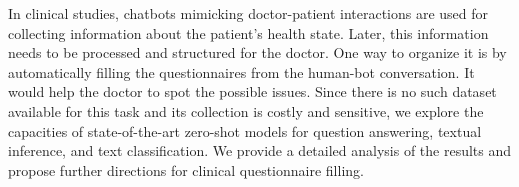 In clinical studies, chatbots mimicking doctor-patient interactions are used for collecting information about the patient's health state. Later, this information needs to be processed and structured for the doctor. One way to organize it is by automatically filling the questionnaires from the human-bot conversation. It would help the doctor to spot the possible issues. Since there is no such dataset available for this task and its collection is costly and sensitive, we explore the capacities of state-of-the-art zero-shot models for question answering, textual inference, and text classification. We provide a detailed analysis of the results and propose further directions for clinical questionnaire filling.
